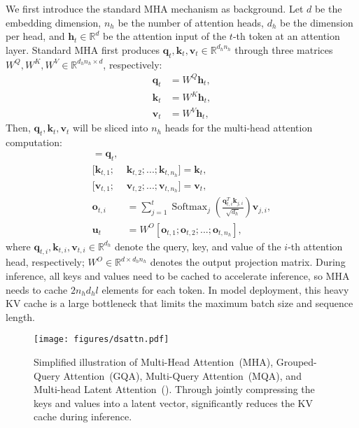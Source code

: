 We first introduce the standard MHA mechanism as background. 
Let $d$ be the embedding dimension, $n_h$ be the number of attention heads, $d_h$ be the dimension per head, and $\mathbf{h}_{t} \in \mathbb{R}^{d}$ be the attention input of the $t$-th token at an attention layer. 
Standard MHA first produces $\mathbf{q}_{t}, \mathbf{k}_{t}, \mathbf{v}_{t} \in \mathbb{R}^{d_h n_h}$ through three matrices $W^{Q}, W^{K}, W^{V} \in \mathbb{R}^{d_h n_h \times d}$, respectively: 
\begin{align}
    \mathbf{q}_{t} &= W^{Q} \mathbf{h}_{t}, \\
    \mathbf{k}_{t} &= W^{K} \mathbf{h}_{t}, \\
    \mathbf{v}_{t} &= W^{V} \mathbf{h}_{t},
\end{align}
Then, $\mathbf{q}_{t}, \mathbf{k}_{t}, \mathbf{v}_{t}$ will be sliced into $n_h$ heads for the multi-head attention computation: 
\begin{align}
    [\mathbf{q}_{t, 1};&\mathbf{q}_{t, 2};...;\mathbf{q}_{t, n_{h}}] = \mathbf{q}_{t}, \\
    [\mathbf{k}_{t, 1};&\mathbf{k}_{t, 2};...;\mathbf{k}_{t, n_{h}}] = \mathbf{k}_{t}, \\
    [\mathbf{v}_{t, 1};&\mathbf{v}_{t, 2};...;\mathbf{v}_{t, n_{h}}] = \mathbf{v}_{t}, \\
    \mathbf{o}_{t, i} &= \sum_{j=1}^{t} \operatorname{Softmax}_j(\frac{\mathbf{q}_{t, i}^T \mathbf{k}_{j, i}}{\sqrt{d_{h}}}) \mathbf{v}_{j, i}, \\ 
    \mathbf{u}_{t} &= W^{O} [\mathbf{o}_{t, 1};\mathbf{o}_{t, 2};...;\mathbf{o}_{t, n_{h}}],
\end{align}
where $\mathbf{q}_{t, i}, \mathbf{k}_{t, i}, \mathbf{v}_{t, i} \in \mathbb{R}^{d_h}$ denote the query, key, and value of the $i$-th attention head, respectively; 
$W^{O} \in \mathbb{R}^{d \times d_h n_h}$ denotes the output projection matrix. 
During inference, all keys and values need to be cached to accelerate inference, so MHA needs to cache $2 n_{h} d_{h} l$ elements for each token. 
In model deployment, this heavy KV cache is a large bottleneck that limits the maximum batch size and sequence length. 

\begin{figure}[!t]
\centering
\texttt{[image: figures/dsattn.pdf]}
\caption{
Simplified illustration of Multi-Head Attention~(MHA), Grouped-Query Attention~(GQA), Multi-Query Attention~(MQA), and Multi-head Latent Attention~(\dsattn{}).  
Through jointly compressing the keys and values into a latent vector, \dsattn{} significantly reduces the KV cache during inference. 
}
\label{fig:dsattn}
\end{figure}

